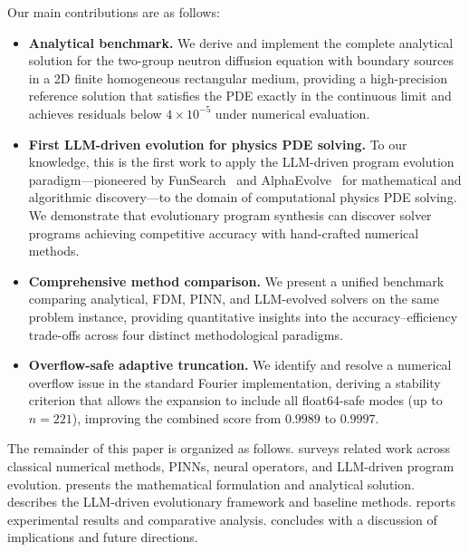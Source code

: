 Our main contributions are as follows:
\begin{itemize}
    \item \textbf{Analytical benchmark.} We derive and implement the complete analytical solution for the two-group neutron diffusion equation with boundary sources in a 2D finite homogeneous rectangular medium, providing a high-precision reference solution that satisfies the PDE exactly in the continuous limit and achieves residuals below $4 \times 10^{-5}$ under numerical evaluation.

    \item \textbf{First LLM-driven evolution for physics PDE solving.} To our knowledge, this is the first work to apply the LLM-driven program evolution paradigm---pioneered by FunSearch~\cite{funsearch2024} and AlphaEvolve~\cite{alphaevolve2025} for mathematical and algorithmic discovery---to the domain of computational physics PDE solving. We demonstrate that evolutionary program synthesis can discover solver programs achieving competitive accuracy with hand-crafted numerical methods.

    \item \textbf{Comprehensive method comparison.} We present a unified benchmark comparing analytical, FDM, PINN, and LLM-evolved solvers on the same problem instance, providing quantitative insights into the accuracy--efficiency trade-offs across four distinct methodological paradigms.

    \item \textbf{Overflow-safe adaptive truncation.} We identify and resolve a numerical overflow issue in the standard Fourier implementation, deriving a stability criterion that allows the expansion to include all float64-safe modes (up to $n{=}221$), improving the combined score from $0.9989$ to $0.9997$.
\end{itemize}

The remainder of this paper is organized as follows.
 surveys related work across classical numerical methods, PINNs, neural operators, and LLM-driven program evolution.
 presents the mathematical formulation and analytical solution.
 describes the LLM-driven evolutionary framework and baseline methods.
 reports experimental results and comparative analysis.
 concludes with a discussion of implications and future directions.
